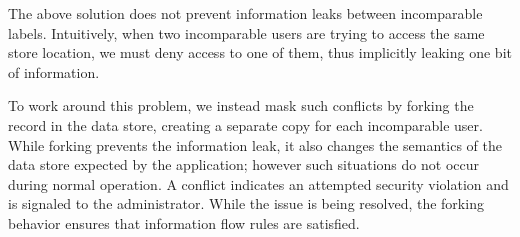 The above solution does not prevent information leaks between incomparable labels. Intuitively, when two incomparable users are trying to access the same store location, we must deny access to one of them, thus implicitly leaking one bit of information.

To work around this problem, we instead mask such conflicts by forking the record in the data store, creating a separate copy for each incomparable user. While forking prevents the information leak, it also changes the semantics of the data store expected by the application; however such situations do not occur during normal operation. A conflict indicates an attempted security violation and is signaled to the administrator. While the issue is being resolved, the forking behavior ensures that information flow rules are satisfied.


